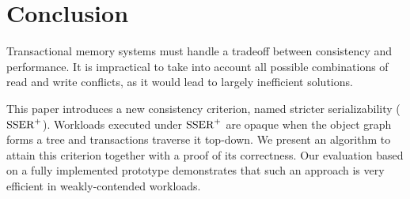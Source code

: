 \section{Conclusion}

Transactional memory systems must handle a tradeoff between consistency and performance.
It is impractical to take into account all possible combinations of read and write conflicts, as it would lead to largely inefficient solutions.

This paper introduces a new consistency criterion, named stricter serializability ($\SPSER$).
Workloads executed under $\SPSER$ are opaque when the object graph forms a tree and transactions traverse it top-down.
We present an algorithm to attain this criterion together with a proof of its correctness.
Our evaluation based on a fully implemented prototype demonstrates that such an approach is very efficient in weakly-contended workloads.



